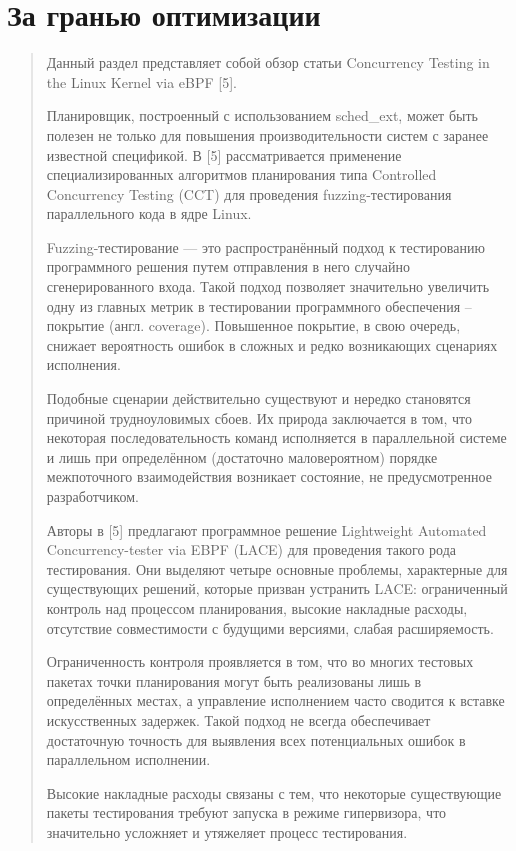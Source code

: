 \documentclass[12pt, oneside]{book}
\begin{document}
\section{За гранью оптимизации}
\begin{quote}
  Данный раздел представляет собой обзор статьи 
  Concurrency Testing in the Linux Kernel via eBPF [5].

  Планировщик, построенный с использованием sched\_ext, может быть
  полезен не только для повышения производительности систем с заранее
  известной спецификой. В [5] рассматривается применение специализированных
  алгоритмов планирования типа Controlled Concurrency Testing (CCT)
  для проведения fuzzing-тестирования параллельного кода в ядре Linux.

  Fuzzing-тестирование --- это распространённый подход к тестированию
  программного решения путем отправления в него случайно сгенерированного входа.
  Такой подход позволяет значительно увеличить одну из главных метрик
  в тестировании программного обеспечения -- покрытие (англ. coverage).
  Повышенное покрытие, в свою очередь, снижает вероятность ошибок в сложных
  и редко возникающих сценариях исполнения.

  Подобные сценарии действительно существуют и нередко становятся причиной
  трудноуловимых сбоев. Их природа заключается в том, что некоторая
  последовательность команд исполняется в параллельной системе и лишь
  при определённом (достаточно маловероятном) порядке межпоточного
  взаимодействия возникает состояние, не предусмотренное разработчиком.

  Авторы в [5] предлагают программное решение Lightweight Automated \\
  Concurrency-tester via EBPF (LACE) для проведения такого рода
  тестирования. Они выделяют четыре основные проблемы,
  характерные для существующих решений, которые призван устранить LACE:
  ограниченный контроль над процессом планирования,
  высокие накладные расходы,
  отсутствие совместимости с будущими версиями,
  слабая расширяемость.

  Ограниченность контроля проявляется в том, что во многих
  тестовых пакетах точки планирования могут быть реализованы лишь в
  определённых местах, а управление исполнением часто сводится
  к вставке искусственных задержек.
  Такой подход не всегда обеспечивает достаточную
  точность для выявления всех потенциальных ошибок в параллельном
  исполнении.

  Высокие накладные расходы связаны с тем, что некоторые
  существующие пакеты тестирования требуют запуска в режиме
  гипервизора, что значительно усложняет и утяжеляет процесс тестирования.
 

\end{quote}
\end{document}
